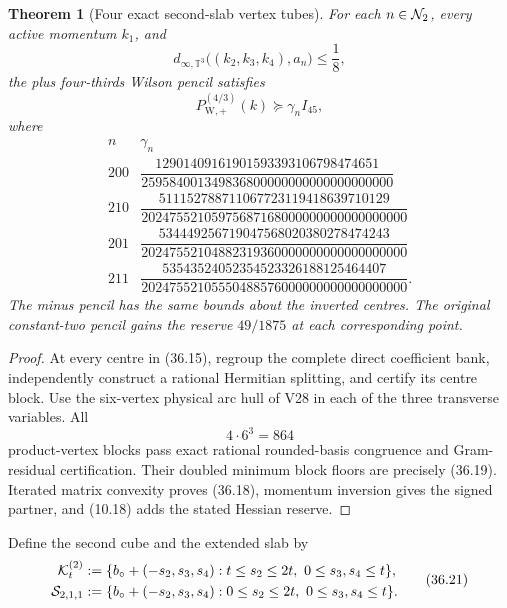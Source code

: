 \documentclass[11pt,oneside]{article}
\newtheorem{theorem}{Theorem}[section]
\theoremstyle{definition}
\theoremstyle{remark}
\begin{document}
\begin{theorem}[Four exact second-slab vertex tubes]
\label{thm:newv36-four-charts}
For each \(n\in{\cal N}_2\), every active momentum \(k_1\), and
\[
 d_{\infty,\mathbb T^3}
 \bigl((k_2,k_3,k_4),a_n\bigr)\le\frac18,              \tag{36.17}
\]
the plus four-thirds Wilson pencil satisfies
\[
 P_{\mathrm W,+}^{(4/3)}(k)\succeq\gamma_n I_{45},    \tag{36.18}
\]
where
\[
\begin{array}{c|c}
n&\gamma_n\\ \hline
200&
\dfrac{12901409161901593393106798474651}
{259584001349836800000000000000000000}\\[6pt]
210&
\dfrac{511152788711067723119418639710129}
{20247552105975687168000000000000000000}\\[6pt]
201&
\dfrac{534449256719047568020380278474243}
{20247552104882319360000000000000000000}\\[6pt]
211&
\dfrac{53543524052354523326188125464407}
{20247552105550488576000000000000000000}.
\end{array}                                            \tag{36.19}
\]
The minus pencil has the same bounds about the inverted centres.
The original constant-two pencil gains the reserve \(49/1875\) at
each corresponding point.
\end{theorem}

\begin{proof}
At every centre in (36.15), regroup the complete direct coefficient
bank, independently construct a rational Hermitian splitting, and
certify its centre block.  Use the six-vertex physical arc hull of
V28 in each of the three transverse variables.  All
\[
 4\cdot6^3=864                                         \tag{36.20}
\]
product-vertex blocks pass exact rational rounded-basis congruence
and Gram-residual certification.  Their doubled minimum block
floors are precisely (36.19).  Iterated matrix convexity proves
(36.18), momentum inversion gives the signed partner, and (10.18)
adds the stated Hessian reserve.
\end{proof}

Define the second cube and the extended slab by
\[
\begin{split}
 {\cal K}^{(2)}_t
  &:=
 \{b_\circ+(-s_2,s_3,s_4):
       t\le s_2\le2t,\ 0\le s_3,s_4\le t\},\\
 {\cal S}_{2,1,1}
  &:=
 \{b_\circ+(-s_2,s_3,s_4):
       0\le s_2\le2t,\ 0\le s_3,s_4\le t\}.
\end{split}                                            \tag{36.21}
\]
\end{document}
